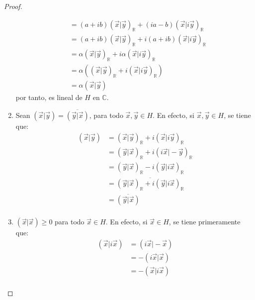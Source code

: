 \documentclass[12pt]{report}
\newcounter{it}
\theoremstyle{largebreak}
\newcommand\pint[2]{\ensuremath{\left(#1\big|#2\right)}}
\newcommand\conj[1]{\ensuremath{\overline{#1}}}
\begin{document}
\begin{proof}
\begin{enumerate}
\begin{equation*}
\begin{split}
                    &=(a+ib)\pint{\vec{x}}{\vec{y}}_{\mathbb{R}}+(ia-b)\pint{\vec{x}}{i\vec{y}}_{\mathbb{R}}\\
                    &=(a+ib)\pint{\vec{x}}{\vec{y}}_{\mathbb{R}}+i(a+ib)\pint{\vec{x}}{i\vec{y}}_{\mathbb{R}}\\
                    &=\alpha\pint{\vec{x}}{\vec{y}}_{\mathbb{R}}+i\alpha\pint{\vec{x}}{i\vec{y}}_{\mathbb{R}}\\
                    &=\alpha(\pint{\vec{x}}{\vec{y}}_{\mathbb{R}}+i\pint{\vec{x}}{i\vec{y}}_{\mathbb{R}})\\
                    &=\alpha\pint{\vec{x}}{\vec{y}}
                \end{split}
            \end{equation*}
            por tanto, es lineal de $H$ en $\mathbb{C}$.
            \item Sean $\pint{\vec{x}}{\vec{y}}=\conj{\pint{\vec{y}}{\vec{x}}}$, para todo $\vec{x},\vec{y}\in H$. En efecto, si $\vec{x},\vec{y}\in H$, se tiene que:
            \begin{equation*}
                \begin{split}
                    \pint{\vec{x}}{\vec{y}}&=\pint{\vec{x}}{\vec{y}}_{\mathbb{R}}+i\pint{\vec{x}}{i\vec{y}}_{\mathbb{R}}\\
                    &=\pint{\vec{y}}{\vec{x}}_{\mathbb{R}}+i\pint{i\vec{x}}{-\vec{y}}_{\mathbb{R}}\\
                    &=\pint{\vec{y}}{\vec{x}}_{\mathbb{R}}-i\pint{\vec{y}}{i\vec{x}}_{\mathbb{R}}\\
                    &=\conj{\pint{\vec{y}}{\vec{x}}_{\mathbb{R}}+i\pint{\vec{y}}{i\vec{x}}_{\mathbb{R}}}\\
                    &=\conj{\pint{\vec{y}}{\vec{x}}}\\
                \end{split}
            \end{equation*}
            \item $\pint{\vec{x}}{\vec{x}}\geq 0$ para todo $\vec{x}\in H$. En efecto, si $\vec{x}\in H$, se tiene primeramente que:
            \begin{equation*}
                \begin{split}
                    \pint{\vec{x}}{i\vec{x}}&=\pint{i\vec{x}}{-\vec{x}}\\
                    &=-\pint{i\vec{x}}{\vec{x}}\\
                    &=-\pint{\vec{x}}{i\vec{x}}\\

\end{split}
\end{equation*}
\end{enumerate}
\end{proof}
\end{document}

